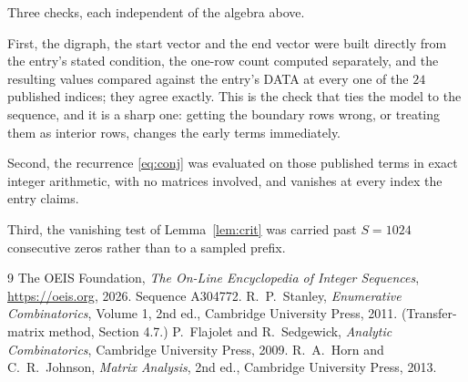 \documentclass[11pt,a4paper]{article}
\theoremstyle{plain}
\theoremstyle{definition}
\begin{document}
Three checks, each independent of the algebra above.

First, the digraph, the start vector and the end vector were built directly from the
entry's stated condition, the one-row count computed separately, and the resulting values
compared against the entry's DATA at every one of the $24$ published indices; they
agree exactly. This is the check that ties the model to the sequence, and it is a sharp one:
getting the boundary rows wrong, or treating them as interior rows, changes the early terms
immediately.

Second, the recurrence \eqref{eq:conj} was evaluated on those published terms in exact
integer arithmetic, with no matrices involved, and vanishes at every index the entry claims.

Third, the vanishing test of Lemma~\ref{lem:crit} was carried past $S=1024$ consecutive
zeros rather than to a sampled prefix.

\begin{thebibliography}{9}
 The OEIS Foundation, \emph{The On-Line Encyclopedia of Integer
Sequences}, \url{https://oeis.org}, 2026. Sequence A304772.
 R.~P.~Stanley, \emph{Enumerative Combinatorics}, Volume 1, 2nd ed.,
Cambridge University Press, 2011. (Transfer-matrix method, Section 4.7.)
 P.~Flajolet and R.~Sedgewick, \emph{Analytic Combinatorics}, Cambridge
University Press, 2009.
 R.~A.~Horn and C.~R.~Johnson, \emph{Matrix Analysis}, 2nd ed., Cambridge
University Press, 2013.
\end{thebibliography}
\end{document}
